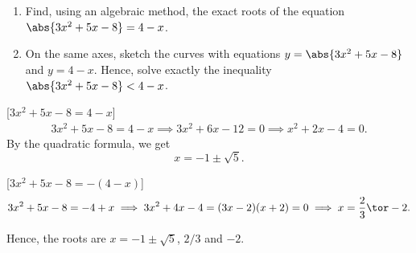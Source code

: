 \begin{problem}
    \begin{enumerate}
        \item Find, using an algebraic method, the exact roots of the equation $\abs{3x^2 + 5x - 8} = 4-x$.
        \item On the same axes, sketch the curves with equations $y = \abs{3x^2 + 5x - 8}$ and $y = 4-x$. Hence, solve exactly the inequality $\abs{3x^2 + 5x - 8} < 4-x$.
    \end{enumerate}
\end{problem}
\begin{solution}
    \begin{ppart}
        [$3x^2 + 5x - 8 = 4-x$]
        \begin{gather*}
            3x^2 + 5x - 8 = 4-x \implies 3x^2 + 6x - 12 = 0 \implies x^2 + 2x - 4 = 0.
        \end{gather*}
        By the quadratic formula, we get \[x = -1\pm\sqrt5.\]

        [$3x^2 + 5x - 8 = -(4-x)$]
        \[3x^2 + 5x - 8 = -4 + x \implies 3x^2 + 4x - 4 = (3x-2)(x+2) = 0 \implies x = \frac23 \tor -2.\]

        Hence, the roots are $x = -1\pm\sqrt5$, $2/3$ and $-2$.
    \end{ppart}
    \begin{ppart}
        \begin{center}
\end{center}
\end{ppart}
\end{solution}

